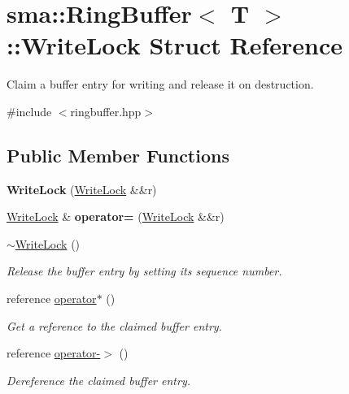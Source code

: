 \hypertarget{structsma_1_1RingBuffer_1_1WriteLock}{\section{sma\-:\-:Ring\-Buffer$<$ T $>$\-:\-:Write\-Lock Struct Reference}
\label{structsma_1_1RingBuffer_1_1WriteLock}
}


Claim a buffer entry for writing and release it on destruction.  




{\ttfamily \#include $<$ringbuffer.\-hpp$>$}

\subsection*{Public Member Functions}
\begin{DoxyCompactItemize}
\item 
\hypertarget{structsma_1_1RingBuffer_1_1WriteLock_a36c097ec664a70f0c021cfa14ceeccd5}{{\bfseries Write\-Lock} (\hyperlink{structsma_1_1RingBuffer_1_1WriteLock}{Write\-Lock} \&\&r)}\label{structsma_1_1RingBuffer_1_1WriteLock_a36c097ec664a70f0c021cfa14ceeccd5}

\item 
\hypertarget{structsma_1_1RingBuffer_1_1WriteLock_a4b2e99fdbc9bda1df33f9b8db0754004}{\hyperlink{structsma_1_1RingBuffer_1_1WriteLock}{Write\-Lock} \& {\bfseries operator=} (\hyperlink{structsma_1_1RingBuffer_1_1WriteLock}{Write\-Lock} \&\&r)}\label{structsma_1_1RingBuffer_1_1WriteLock_a4b2e99fdbc9bda1df33f9b8db0754004}

\item 
\hyperlink{structsma_1_1RingBuffer_1_1WriteLock_aeefbe6bb3ec9a93441aa3b4169d82c9d}{$\sim$\-Write\-Lock} ()
\begin{DoxyCompactList}\small\item\em Release the buffer entry by setting its sequence number. \end{DoxyCompactList}\item 
reference \hyperlink{structsma_1_1RingBuffer_1_1WriteLock_ac397fb68fa66eff6ef7f22c8bc513876}{operator$\ast$} ()
\begin{DoxyCompactList}\small\item\em Get a reference to the claimed buffer entry. \end{DoxyCompactList}\item 
\hypertarget{structsma_1_1RingBuffer_1_1WriteLock_a7b58c358bb92dec4dfaa8c6c3fb169e9}{reference \hyperlink{structsma_1_1RingBuffer_1_1WriteLock_a7b58c358bb92dec4dfaa8c6c3fb169e9}{operator-\/$>$} ()}\label{structsma_1_1RingBuffer_1_1WriteLock_a7b58c358bb92dec4dfaa8c6c3fb169e9}

\begin{DoxyCompactList}\small\item\em Dereference the claimed buffer entry. \end{DoxyCompactList}\end{DoxyCompactItemize}
